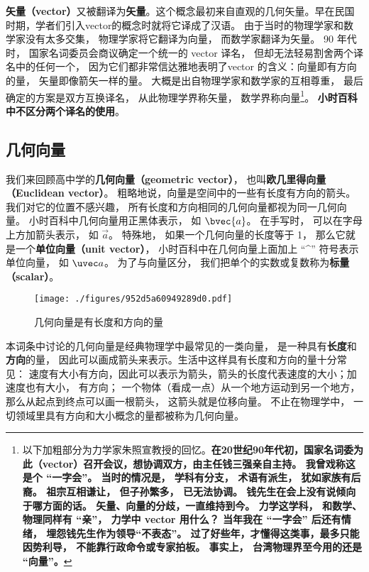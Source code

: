 


\textbf{矢量（vector）}又被翻译为\textbf{矢量}。这个概念最初来自直观的几何矢量。早在民国时期，学者们引入vector的概念时就将它译成了汉语。 由于当时的物理学家和数学家没有太多交集， 物理学家将它翻译为向量， 而数学家翻译为矢量。 90 年代时， 国家名词委员会商议确定一个统一的 vector 译名， 但却无法轻易割舍两个译名中的任何一个， 因为它们都非常信达雅地表明了vector 的含义：向量即有方向的量， 矢量即像箭矢一样的量。 大概是出自物理学家和数学家的互相尊重， 最后确定的方案是双方互换译名， 从此物理学界称矢量， 数学界称向量\footnote{以下加粗部分为力学家朱照宣教授的回忆。\textbf{在20世纪90年代初，国家名词委为此（vector）召开会议，想协调双方，由主任钱三强亲自主持。 我曾戏称这是个 “一字会”。 当时的情况是， 学科有分支， 术语有派生， 犹如家族有后裔。 祖宗互相谦让， 但子孙繁多， 已无法协调。 钱先生在会上没有说倾向于哪方面的话。 矢量、向量的分歧，一直维持到今。 力学这学科， 和数学、物理同样有 “亲”， 力学中 vector 用什么？ 当年我在 “一字会” 后还有情绪， 埋怨钱先生作为领导“不表态”。 过了好些年，才懂得这类事，最多只能因势利导， 不能靠行政命令或专家拍板。 事实上， 台湾物理界至今用的还是 “向量”。}}。 \textbf{小时百科中不区分两个译名的使用}。


\subsection{几何向量}

我们来回顾高中学的\textbf{几何向量（geometric vector）}， 也叫\textbf{欧几里得向量（Euclidean vector）}。 粗略地说，向量是空间中的一些有长度有方向的箭头。 我们对它的位置不感兴趣， 所有长度和方向相同的几何向量都视为同一几何向量。 小时百科中几何向量用正黑体表示， 如 $\bvec{a}$。 在手写时， 可以在字母上方加箭头表示， 如 $\overrightarrow{a}$。 特殊地， 如果一个几何向量的长度等于 1， 那么它就是一个\textbf{单位向量（unit vector）}， 小时百科中在几何向量上面加上 “\^{}” 符号表示单位向量， 如 $\uvec a$。 为了与向量区分， 我们把单个的实数或复数称为\textbf{标量（scalar）}。

\begin{figure}[ht]
\centering
\texttt{[image: ./figures/952d5a60949289d0.pdf]}
\caption{几何向量是有长度和方向的量} \label{fig_GVec_4}
\end{figure}
本词条中讨论的几何向量是经典物理学中最常见的一类向量， 是一种具有\textbf{长度}和\textbf{方向}的量， 因此可以画成箭头来表示。生活中这样具有长度和方向的量十分常见： 速度有大小有方向，因此可以表示为箭头，箭头的长度代表速度的大小；加速度也有大小， 有方向； 一个物体（看成一点）从一个地方运动到另一个地方，那么从起点到终点可以画一根箭头， 这箭头就是位移向量。 不止在物理学中， 一切领域里具有方向和大小概念的量都被称为几何向量。 

